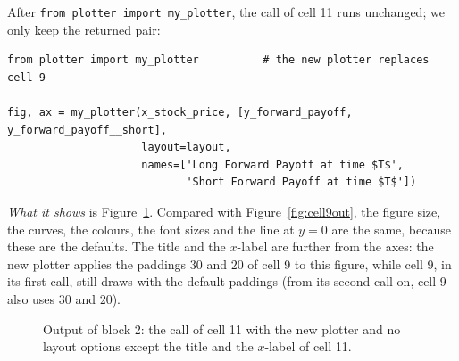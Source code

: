 \documentclass[11pt,a4paper]{article}
\newcommand{\src}[2]{\texttt{#1}, lines #2}
\newcommand{\subhead}[1]{\par\medskip\noindent{\large\bfseries #1}\par\smallskip\noindent\ignorespaces}
\begin{document}
\subhead{The same call with the new plotter.} After \texttt{from plotter import my\_plotter}, the call of cell 11 runs unchanged; we only keep the returned pair:
\par\smallskip\noindent\begin{minipage}{\linewidth}\begin{lstlisting}[style=py,title={\src{hw21\_examples.py}{30--35} (block 2)}]
from plotter import my_plotter          # the new plotter replaces cell 9

fig, ax = my_plotter(x_stock_price, [y_forward_payoff, y_forward_payoff__short],
                     layout=layout,
                     names=['Long Forward Payoff at time $T$',
                            'Short Forward Payoff at time $T$'])
\end{lstlisting}\end{minipage}\par\smallskip
\emph{What it shows} is Figure~\ref{fig:newout}. Compared with Figure~\ref{fig:cell9out}, the figure size, the curves, the colours, the font sizes and the line at $y=0$ are the same, because these are the defaults. The title and the $x$-label are further from the axes: the new plotter applies the paddings $30$ and $20$ of cell 9 to this figure, while cell 9, in its first call, still draws with the default paddings (from its second call on, cell 9 also uses $30$ and $20$).
\begin{figure}[!ht]
\centering
{}
\caption{Output of block 2: the call of cell 11 with the new plotter and no layout options except the title and the $x$-label of cell 11.}
\label{fig:newout}
\end{figure}
\end{document}
